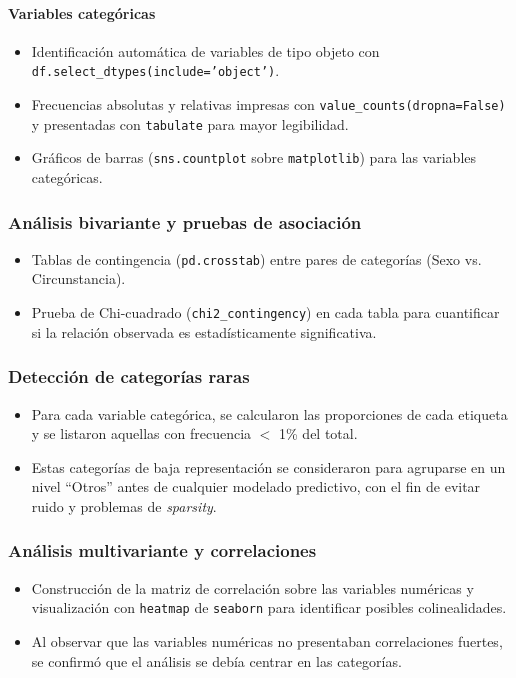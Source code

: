 \documentclass[lettersize,journal]{IEEEtran}
\begin{document}
\paragraph{Variables categóricas}
\begin{itemize}
    \item Identificación automática de variables de tipo objeto con \texttt{df.select\_dtypes(include='object')}.
    \item Frecuencias absolutas y relativas impresas con \texttt{value\_counts(dropna=False)} y presentadas con \texttt{tabulate} para mayor legibilidad.
    \item Gráficos de barras (\texttt{sns.countplot} sobre \texttt{matplotlib}) para las variables categóricas.
\end{itemize}

\subsubsection{Análisis bivariante y pruebas de asociación}
\begin{itemize}
    \item Tablas de contingencia (\texttt{pd.crosstab}) entre pares de categorías (Sexo vs. Circunstancia).
    \item Prueba de Chi-cuadrado (\texttt{chi2\_contingency}) en cada tabla para cuantificar si la relación observada es estadísticamente significativa.
\end{itemize}

\subsubsection{Detección de categorías raras}
\begin{itemize}
    \item Para cada variable categórica, se calcularon las proporciones de cada etiqueta y se listaron aquellas con frecuencia $<$ 1\% del total.
    \item Estas categorías de baja representación se consideraron para agruparse en un nivel “Otros” antes de cualquier modelado predictivo, con el fin de evitar ruido y problemas de \textit{sparsity}.
\end{itemize}

\subsubsection{Análisis multivariante y correlaciones}
\begin{itemize}
    \item Construcción de la matriz de correlación sobre las variables numéricas y visualización con \texttt{heatmap} de \texttt{seaborn} para identificar posibles colinealidades.
    \item Al observar que las variables numéricas no presentaban correlaciones fuertes, se confirmó que el análisis se debía centrar en las categorías.
\end{itemize}
\end{document}
